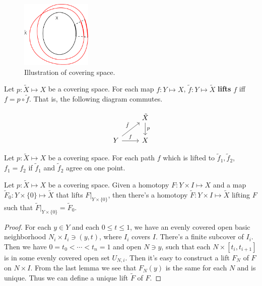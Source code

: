 \documentclass[12pt]{book}
\begin{document}
\begin{figure}[htb!]
	\centering  
	\includegraphics[width=0.3\textwidth]{resources/chap_fund_grp/cover_spc.pdf}  
	\caption{Illustration of covering space.}
	\label{fig:cover_space}
\end{figure}

\begin{definition}
	Let $p:\tilde X\mapsto X$ be a covering space. For each map $f:Y\mapsto X$, $\tilde f:Y\mapsto \tilde X$ {\bf lifts} $f$ iff $f=p \circ \tilde f$. That is, the following diagram commutes.
	
	\[
	\begin{tikzcd}
		& \tilde X\arrow{d}{p}
		\\
		Y \arrow{r}{f} \arrow{ur}{\tilde f}& X  
	\end{tikzcd}
	\]
\end{definition}

\begin{lemma}
	Let $p:\tilde X\mapsto X$ be a covering space. For each path $f$ which is lifted to $\tilde f_1,\tilde f_2$, $f_1=f_2$ if $\tilde f_1$ and $\tilde f_2$ agree on one point.
\end{lemma}

\begin{lemma}
	Let $p:\tilde X\mapsto X$ be a covering space. Given a homotopy $F:Y\times I\mapsto X$ and a map $\tilde F_0:Y\times\{0\}\mapsto \tilde X$ that lifts $F|_{Y\times\{0\}}$, then there's a homotopy $\tilde F:Y\times I\mapsto \tilde X$ lifting $F$ such that $\tilde F|_{Y\times\{0\}}=\tilde F_0$.
\end{lemma}
\begin{proof}
	For each $y\in Y$ and each $0\leq t\leq 1$, we have an evenly covered open basic neighborhood $N_i\times I_i \ni (y,t)$, where $I_i$ covers $I$. There's a finite subcover of $I_i$. Then we have $0=t_0<\cdots<t_n=1$ and open $N\ni y$, such that each $N\times [t_i,t_{i+1}]$ is in some evenly covered open set $U_{N,i}$. Then it's easy to construct a lift $F_N$ of $F$ on $N\times I$. From the last lemma we see that $F_N(y)$ is the same for each $N$ and is unique. Thus we can define a unique lift $\tilde F$ of $F$.
\end{proof}
\end{document}

